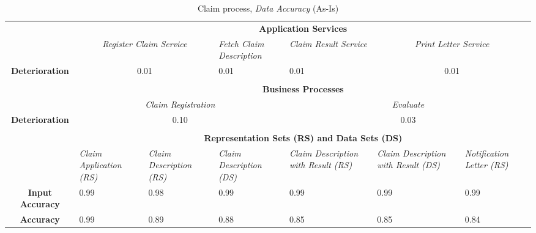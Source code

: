 \begin{center}
\begin{table}[H]
\begin{tabular}{c|p{1.5cm}|p{1.5cm}|p{1.5cm}|p{1.5cm}|p{1.5cm}|p{1.7cm}|}


\cline{2-7}

	& \multicolumn{6}{c|}{\textbf{Application Services}} \\ \cline{2-7}
	& \multicolumn{2}{c|}{\textsl{Register Claim Service}} & \textsl{Fetch Claim Description} & \textsl{Claim Result Service} & \multicolumn{2}{c|}{\textsl{Print Letter Service}} \\ \hline
	\multicolumn{1}{|c|}{\textbf{Deterioration}} & \multicolumn{2}{c|}{0.01} & 0.01 & 0.01 & \multicolumn{2}{c|}{0.01} \\ \hline

	\multicolumn{7}{c}{} \\ \cline{2-7}
	& \multicolumn{6}{c|}{\textbf{Business Processes}} \\ \cline{2-7}
	& \multicolumn{3}{c|}{\textsl{Claim Registration}} & \multicolumn{3}{c|}{\textsl{Evaluate}} \\ \hline
	\multicolumn{1}{|c|}{\textbf{Deterioration}} & \multicolumn{3}{c|}{0.10} & \multicolumn{3}{c|}{0.03} \\ \hline

	
	\multicolumn{7}{c}{} \\ \cline{2-7}
	 & \multicolumn{6}{c|}{\textbf{Representation Sets (RS) and Data Sets (DS)}} \\ \cline{2-7}
	 & \textsl{Claim Application (RS)} & \textsl{Claim Description (RS)} & \textsl{Claim Description (DS)} & \textsl{Claim Description with Result (RS)} & \textsl{Claim Description with Result (DS)} & \textsl{Notification Letter (RS)}\\
\hline
\multicolumn{1}{|c|}{\textbf{Input Accuracy}} & 0.99 & 0.98 & 0.99 & 0.99 & 0.99 & 0.99\\ \hline
\multicolumn{1}{|c|}{\textbf{Accuracy}} & 0.99 & 0.89 & 0.88 & 0.85 & 0.85 & 0.84\\ \hline
\end{tabular}
\caption{Claim process, \textsl{Data Accuracy} (As-Is)}
\label{tab:claim_as_is}
\end{table}
\end{center}